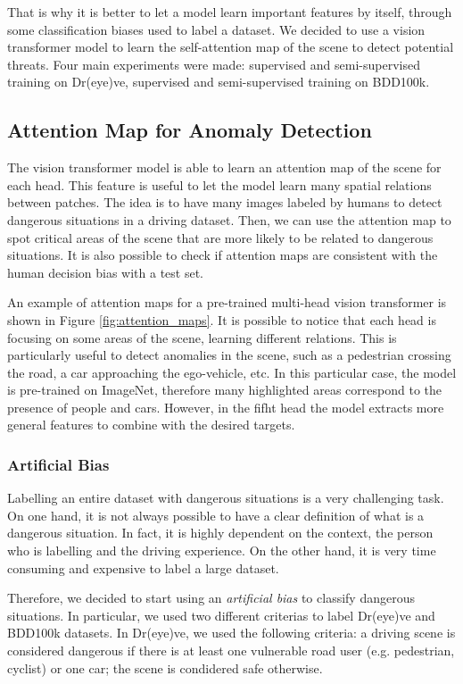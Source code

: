 That is why it is better to let a model learn important features by itself, through 
some classification biases used to label a dataset. We decided to use a vision 
transformer model to learn the self-attention map of the scene to detect 
potential threats.
Four main experiments were made: supervised and semi-supervised training on Dr(eye)ve, 
supervised and semi-supervised training on BDD100k.

\subsection{Attention Map for Anomaly Detection}
The vision transformer model is able to learn an attention map of the scene for 
each head. This feature is useful to let the model learn many spatial relations 
between patches. The idea is to have many images labeled by humans to detect 
dangerous situations in a driving dataset. Then, we can use the attention map 
to spot critical areas of the scene that are more likely to be related to 
dangerous situations.
It is also possible to check if attention maps are consistent with the human 
decision bias with a test set.

An example of attention maps for a pre-trained multi-head vision transformer is 
shown in Figure \ref{fig:attention_maps}.
It is possible to notice that each head is focusing on some areas of the 
scene, learning different relations. This is particularly useful to detect 
anomalies in the scene, such as a pedestrian crossing the road, a car approaching 
the ego-vehicle, etc. In this particular case, the model is pre-trained on 
ImageNet, therefore many highlighted areas correspond to the presence of 
people and cars. However, in the fifht head the model extracts more general 
features to combine with the desired targets.

\subsubsection{Artificial Bias}
Labelling an entire dataset with dangerous situations is a very challenging 
task. On one hand, it is not always possible to have a clear definition of what 
is a dangerous situation. In fact, it is highly dependent on the context, the 
person who is labelling and the driving experience. On the other hand, it is 
very time consuming and expensive to label a large dataset.

Therefore, we decided to start using an \emph{artificial bias} to classify 
dangerous situations. In particular, we used two different criterias to label 
Dr(eye)ve and BDD100k datasets. In Dr(eye)ve, we used the following criteria:
a driving scene is considered dangerous if there is at least one vulnerable 
road user (e.g. pedestrian, cyclist) or one car; the scene is condidered safe 
otherwise.

